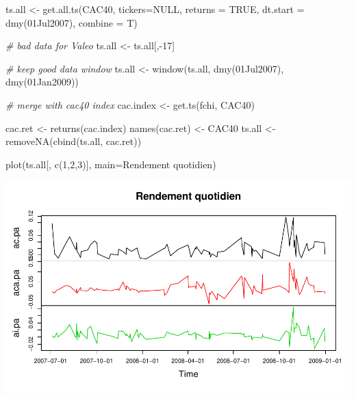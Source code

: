 \documentclass[
]{article}
\newenvironment{Shaded}{\begin{snugshade}}{\end{snugshade}}
\newcommand{\AttributeTok}[1]{\textcolor[rgb]{0.77,0.63,0.00}{#1}}
\newcommand{\CommentTok}[1]{\textcolor[rgb]{0.56,0.35,0.01}{\textit{#1}}}
\newcommand{\ConstantTok}[1]{\textcolor[rgb]{0.00,0.00,0.00}{#1}}
\newcommand{\DecValTok}[1]{\textcolor[rgb]{0.00,0.00,0.81}{#1}}
\newcommand{\FunctionTok}[1]{\textcolor[rgb]{0.00,0.00,0.00}{#1}}
\newcommand{\NormalTok}[1]{#1}
\newcommand{\OtherTok}[1]{\textcolor[rgb]{0.56,0.35,0.01}{#1}}
\newcommand{\SpecialCharTok}[1]{\textcolor[rgb]{0.00,0.00,0.00}{#1}}
\newcommand{\StringTok}[1]{\textcolor[rgb]{0.31,0.60,0.02}{#1}}
\begin{document}
\begin{Shaded}
\begin{Highlighting}[]
\NormalTok{  ts.all }\OtherTok{\textless{}{-}} \FunctionTok{get.all.ts}\NormalTok{(}\StringTok{\textquotesingle{}CAC40\textquotesingle{}}\NormalTok{, }\AttributeTok{tickers=}\ConstantTok{NULL}\NormalTok{, }\AttributeTok{returns =} \ConstantTok{TRUE}\NormalTok{,}
    \AttributeTok{dt.start =} \FunctionTok{dmy}\NormalTok{(}\StringTok{\textquotesingle{}01Jul2007\textquotesingle{}}\NormalTok{), }\AttributeTok{combine =}\NormalTok{ T)}
  
  \CommentTok{\# bad data for Valeo}
\NormalTok{  ts.all }\OtherTok{\textless{}{-}}\NormalTok{ ts.all[,}\SpecialCharTok{{-}}\DecValTok{17}\NormalTok{]}
  
  \CommentTok{\# keep good data window}
\NormalTok{  ts.all }\OtherTok{\textless{}{-}} \FunctionTok{window}\NormalTok{(ts.all, }\FunctionTok{dmy}\NormalTok{(}\StringTok{\textquotesingle{}01Jul2007\textquotesingle{}}\NormalTok{), }
                   \FunctionTok{dmy}\NormalTok{(}\StringTok{\textquotesingle{}01Jan2009\textquotesingle{}}\NormalTok{))}
  
  \CommentTok{\# merge with cac40 index}
\NormalTok{  cac.index }\OtherTok{\textless{}{-}} \FunctionTok{get.ts}\NormalTok{(}\StringTok{\textquotesingle{}fchi\textquotesingle{}}\NormalTok{, }\StringTok{\textquotesingle{}CAC40\textquotesingle{}}\NormalTok{)}

\NormalTok{  cac.ret }\OtherTok{\textless{}{-}} \FunctionTok{returns}\NormalTok{(cac.index)}
  \FunctionTok{names}\NormalTok{(cac.ret) }\OtherTok{\textless{}{-}} \StringTok{\textquotesingle{}CAC40\textquotesingle{}}
\NormalTok{  ts.all }\OtherTok{\textless{}{-}} \FunctionTok{removeNA}\NormalTok{(}\FunctionTok{cbind}\NormalTok{(ts.all, cac.ret))}
\end{Highlighting}
\end{Shaded}

\begin{Shaded}
\begin{Highlighting}[]
\FunctionTok{plot}\NormalTok{(ts.all[, }\FunctionTok{c}\NormalTok{(}\DecValTok{1}\NormalTok{,}\DecValTok{2}\NormalTok{,}\DecValTok{3}\NormalTok{)], }\AttributeTok{main=}\StringTok{\textquotesingle{}Rendement quotidien\textquotesingle{}}\NormalTok{)}
\end{Highlighting}
\end{Shaded}

\includegraphics{TP1_files/figure-latex/plot-cac-1-1.pdf}
\end{document}
